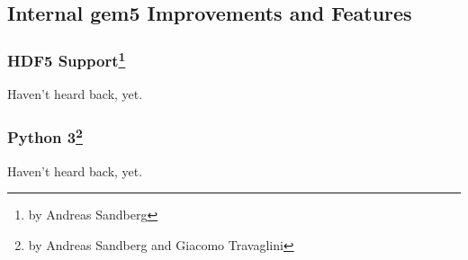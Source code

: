 \subsection{Internal gem5 Improvements and Features}

\subsubsection[HDF5 Support]{HDF5 Support\footnote{by Andreas Sandberg}}

Haven't heard back, yet.

\subsubsection[Python 3]{Python 3\footnote{by Andreas Sandberg and Giacomo Travaglini}}

Haven't heard back, yet.

